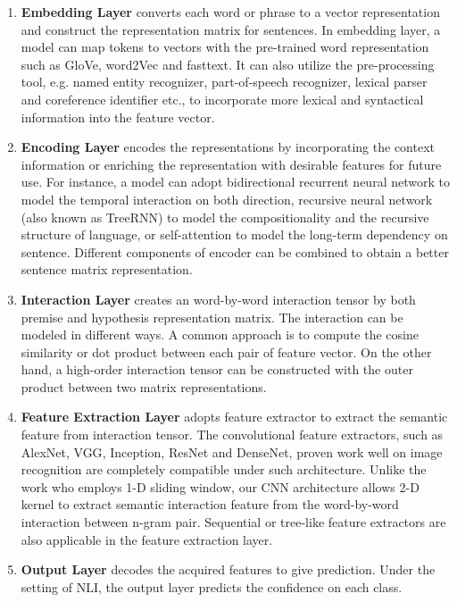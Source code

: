 \documentclass{article} \usepackage{iclr2018_conference,times}
\begin{document}
\begin{enumerate}
\item \textbf{Embedding Layer} converts each word or phrase to a vector representation and construct the representation matrix for sentences. In embedding layer, a model can map tokens to vectors with the pre-trained word representation such as GloVe\citep{GloVe_Pennington:2014jd}, word2Vec\citep{word2vec_Mikolov:2013uz} and fasttext\citep{fasttext_Joulin:2016uo}. It can also utilize the pre-processing tool, e.g. named entity recognizer, part-of-speech recognizer, lexical parser and coreference identifier etc., to incorporate more lexical and syntactical information into the feature vector.

\item \textbf{Encoding Layer} encodes the representations by incorporating the context information or enriching the representation with desirable features for future use. For instance, a model can adopt bidirectional recurrent neural network to model the temporal interaction on both direction, recursive neural network\citep{TreeRNN_Socher:2011wx} (also known as TreeRNN) to model the compositionality and the recursive structure of language, or self-attention to model the long-term dependency on sentence. Different components of encoder can be combined to obtain a better sentence matrix representation.

\item \textbf{Interaction Layer} creates an word-by-word interaction tensor by both premise and hypothesis representation matrix. The interaction can be modeled in different ways. A common approach is to compute the cosine similarity or dot product between each pair of feature vector. On the other hand, a high-order interaction tensor can be constructed with the outer product between two matrix representations. 

\item \textbf{Feature Extraction Layer} adopts feature extractor to extract the semantic feature from interaction tensor. The convolutional feature extractors, such as AlexNet\citep{AlexNet_Krizhevsky:2012wl}, VGG\citep{VGG_Simonyan:2014ws}, Inception\citep{inception_Szegedy:2014tb}, ResNet\citep{ResNet_He:2016tt} and DenseNet\citep{DenseNet_Huang:2016wa}, proven work well on image recognition are completely compatible under such architecture.
Unlike the work \citep{conv_sentence_classification_2014arXiv1408.5882K,charConv_2015arXiv150901626Z} who employs 1-D sliding window, our CNN architecture allows 2-D kernel to extract semantic interaction feature from the word-by-word interaction between n-gram pair. Sequential or tree-like feature extractors are also applicable in the feature extraction layer. 

\item \textbf{Output Layer} decodes the acquired features to give prediction. Under the setting of NLI, the output layer predicts the confidence on each class.

\end{enumerate}
\end{document}
